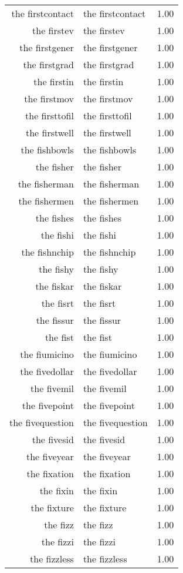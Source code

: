 \begin{table}[ht]
\begin{tabular}{rlr}
  the firstcontact & the firstcontact & 1.00 \\ 
  the firstev & the firstev & 1.00 \\ 
  the firstgener & the firstgener & 1.00 \\ 
  the firstgrad & the firstgrad & 1.00 \\ 
  the firstin & the firstin & 1.00 \\ 
  the firstmov & the firstmov & 1.00 \\ 
  the firsttofil & the firsttofil & 1.00 \\ 
  the firstwell & the firstwell & 1.00 \\ 
  the fishbowls & the fishbowls & 1.00 \\ 
  the fisher & the fisher & 1.00 \\ 
  the fisherman & the fisherman & 1.00 \\ 
  the fishermen & the fishermen & 1.00 \\ 
  the fishes & the fishes & 1.00 \\ 
  the fishi & the fishi & 1.00 \\ 
  the fishnchip & the fishnchip & 1.00 \\ 
  the fishy & the fishy & 1.00 \\ 
  the fiskar & the fiskar & 1.00 \\ 
  the fisrt & the fisrt & 1.00 \\ 
  the fissur & the fissur & 1.00 \\ 
  the fist & the fist & 1.00 \\ 
  the fiumicino & the fiumicino & 1.00 \\ 
  the fivedollar & the fivedollar & 1.00 \\ 
  the fivemil & the fivemil & 1.00 \\ 
  the fivepoint & the fivepoint & 1.00 \\ 
  the fivequestion & the fivequestion & 1.00 \\ 
  the fivesid & the fivesid & 1.00 \\ 
  the fiveyear & the fiveyear & 1.00 \\ 
  the fixation & the fixation & 1.00 \\ 
  the fixin & the fixin & 1.00 \\ 
  the fixture & the fixture & 1.00 \\ 
  the fizz & the fizz & 1.00 \\ 
  the fizzi & the fizzi & 1.00 \\ 
  the fizzless & the fizzless & 1.00 \\ 

\end{tabular}
\end{table}
